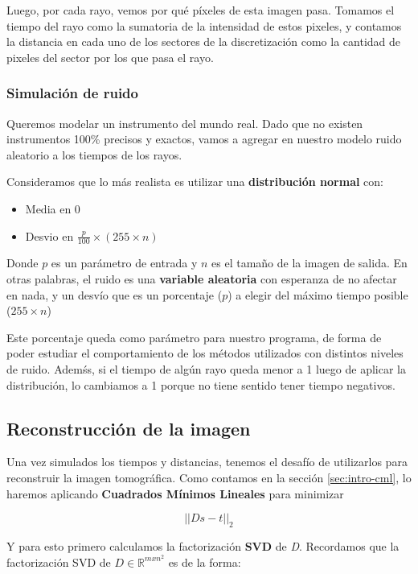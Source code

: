 Luego, por cada rayo, vemos por qué píxeles de esta imagen pasa.
Tomamos el tiempo del rayo como la sumatoria de la intensidad de estos pixeles,
y contamos la distancia en cada uno de los sectores de la discretización
como la cantidad de pixeles del sector por los que pasa el rayo.

\subsubsection{Simulación de ruido}
\label{sec:desarrollo-noise}
Queremos modelar un instrumento del mundo real.
Dado que no existen instrumentos 100\% precisos y exactos,
vamos a agregar en nuestro modelo ruido aleatorio a los tiempos de los rayos.

Consideramos que lo más realista es utilizar una \textbf{distribución normal} con:
\begin{itemize}
	\item Media en 0
	\item Desvio en $\frac{p}{100} \times (255 \times n)$
\end{itemize}
Donde $p$ es un parámetro de entrada y $n$ es el tamaño de la imagen de salida.
En otras palabras, el ruido es una \textbf{variable aleatoria} con esperanza de no afectar en nada, y un desvío que es un 
porcentaje ($p$) a elegir del máximo tiempo posible ($255 \times n$)

Este porcentaje queda como parámetro para nuestro programa,
de forma de poder estudiar el comportamiento de los métodos utilizados con distintos niveles de ruido. 
Ademśs, si el tiempo de algún rayo queda menor a 1 luego de aplicar la distribución, 
lo cambiamos a 1 porque no tiene sentido tener tiempo negativos.

\subsection{Reconstrucción de la imagen}
Una vez simulados los tiempos y distancias,
tenemos el desafío de utilizarlos para reconstruir la imagen tomográfica.
Como contamos en la sección \ref{sec:intro-cml},
lo haremos aplicando \textbf{Cuadrados Mínimos Lineales} para minimizar

\begin{equation*}
	||Ds - t||_{2}
\end{equation*}

Y para esto primero calculamos la factorización \textbf{SVD} de \textit{D}.
Recordamos que la factorización SVD de $D \in \mathbb{R}^{mxn^{2}}$ es de la forma:

